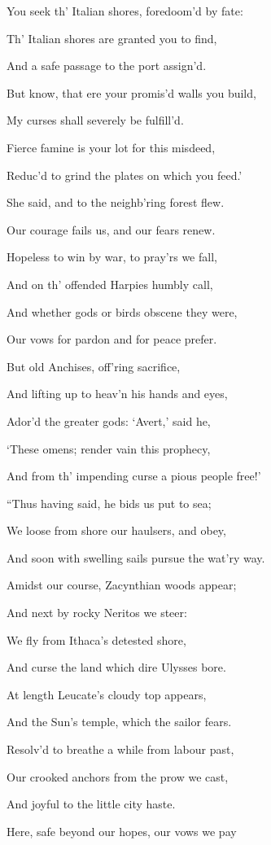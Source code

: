 You seek th’ Italian shores, foredoom’d by fate:

Th’ Italian shores are granted you to find,

And a safe passage to the port assign’d.

But know, that ere your promis’d walls you build,

My curses shall severely be fulfill’d.

Fierce famine is your lot for this misdeed,

Reduc’d to grind the plates on which you feed.’

She said, and to the neighb’ring forest flew.

Our courage fails us, and our fears renew.

Hopeless to win by war, to pray’rs we fall,

And on th’ offended Harpies humbly call,

And whether gods or birds obscene they were,

Our vows for pardon and for peace prefer.

But old Anchises, off’ring sacrifice,

And lifting up to heav’n his hands and eyes,

Ador’d the greater gods: ‘Avert,’ said he,

‘These omens; render vain this prophecy,

And from th’ impending curse a pious people free!’

“Thus having said, he bids us put to sea;

We loose from shore our haulsers, and obey,

And soon with swelling sails pursue the wat’ry way.

Amidst our course, Zacynthian woods appear;

And next by rocky Neritos we steer:

We fly from Ithaca’s detested shore,

And curse the land which dire Ulysses bore.

At length Leucate’s cloudy top appears,

And the Sun’s temple, which the sailor fears.

Resolv’d to breathe a while from labour past,

Our crooked anchors from the prow we cast,

And joyful to the little city haste.

Here, safe beyond our hopes, our vows we pay

